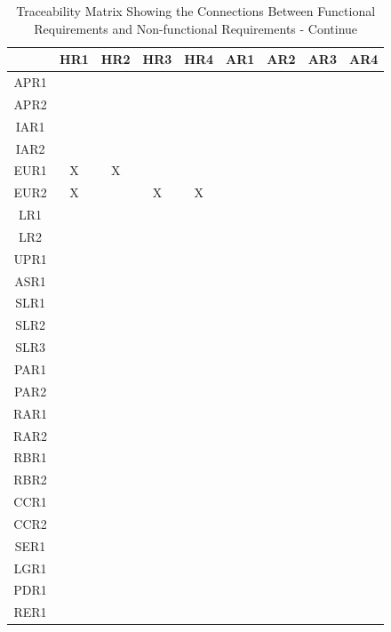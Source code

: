 \documentclass[12pt]{article}
\begin{document}
\begin{landscape}
\begin{table}[h!]
\centering
\begin{tabular}{|c|c|c|c|c|c|c|c|c|}
\hline
& HR1 & HR2 & HR3 & HR4 & AR1 & AR2 & AR3 & AR4 \\
\hline
APR1        & & & & & & & & \\ \hline
APR2        & & & & & & & & \\ \hline
IAR1        & & & & & & & & \\ \hline
IAR2        & & & & & & & & \\ \hline
EUR1        &X &X & & & & & & \\ \hline
EUR2        &X & &X &X & & & & \\ \hline
LR1         & & & & & & & & \\ \hline
LR2         & & & & & & & & \\ \hline
UPR1        & & & & & & & & \\ \hline
ASR1        & & & & & & & & \\ \hline
SLR1        & & & & & & & & \\ \hline
SLR2        & & & & & & & & \\ \hline
SLR3        & & & & & & & & \\ \hline
PAR1        & & & & & & & & \\ \hline
PAR2        & & & & & & & & \\ \hline
RAR1        & & & & & & & & \\ \hline
RAR2        & & & & & & & & \\ \hline
RBR1        & & & & & & & & \\ \hline
RBR2        & & & & & & & & \\ \hline
CCR1        & & & & & & & & \\ \hline
CCR2        & & & & & & & & \\ \hline
SER1        & & & & & & & & \\ \hline
LGR1        & & & & & & & & \\ \hline
PDR1        & & & & & & & & \\ \hline
RER1        & & & & & & & & \\ \hline
\end{tabular}
\caption{Traceability Matrix Showing the Connections Between Functional Requirements and Non-functional Requirements - Continue}
\label{Table:A_trace}
\end{table}
\end{landscape}
\end{document}
